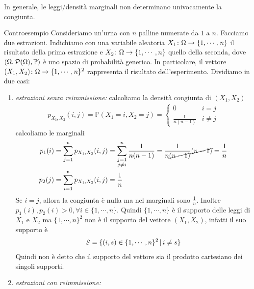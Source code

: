 \documentclass[a4paper]{article}
\begin{document}
In generale, le leggi/densità marginali non determinano univocamente
la congiunta.

\begin{snippetexample}{Controesempio}
    Consideriamo un'urna con \(n\) palline numerate da \(1\) a \(n\).
    Facciamo due estrazioni.
    Indichiamo con una variabile aleatoria \(X_1 \colon \Omega \to \{1, \cdots, n\}\)
    il risultato della prima estrazione e \(X_2 \colon \Omega \to \{1, \cdots, n\}\)
    quello della seconda, dove \((\Omega, \mathcal P(\Omega), \mathbb P)\)
    è uno spazio di probabilità generico.
    In particolare, il vettore \((X_1, X_2) \colon \Omega \to \{1, \cdots, n\}^2\)
    rappresenta il risultato dell'esperimento.
    Dividiamo in due casi:
    \begin{enumerate}
        \item \emph{estrazioni senza reimmissione:}
            calcoliamo la densità congiunta di \((X_1, X_2)\)
            \begin{align*}
                p_{X_1, X_2}(i, j) = \mathbb P(X_1 = i, X_2 = j) =
                \begin{cases}
                    0 & i = j \\
                    \frac{1}{n(n-1)} & i \neq j
                \end{cases}
            \end{align*}
            calcoliamo le marginali
            \begin{align*}
                p_1(i) &= \sum_{j=1}^n p_{X_1, X_2}(i,j)
                = \sum_{\substack{j=1 \\ j \neq i}}^n \frac{1}{n(n-1)} =
                \frac{1}{n\cancel{(n-1)}}\cancel{(n-1)} = \frac 1n \\
                p_2(j) &= \sum_{i=1}^n p_{X_1, X_2}(i,j) = \frac 1n
            \end{align*}
            Se \(i = j\), allora la congiunta è nulla ma nel marginali sono \(\frac 1n\).
            Inoltre \(p_1(i), p_2(i) > 0, \forall i \in \{1, \cdots, n\}\).
            Quindi \(\{1, \cdots, n\}\) è il supporto delle leggi di \(X_1\) e \(X_2\)
            ma \(\{1, \cdots, n\}^2\) non è il supporto del vettore
            \((X_1, X_2)\), infatti il suo supporto è \[
                S = \{(i, s) \in \{1, \cdots, n\}^2 \,|\, i \neq s\}
            \]
            Quindi non è detto che il supporto del vettore
            sia il prodotto cartesiano dei singoli supporti.
        \item \emph{estrazioni con reimmissione:}

\end{enumerate}
\end{snippetexample}
\end{document}

